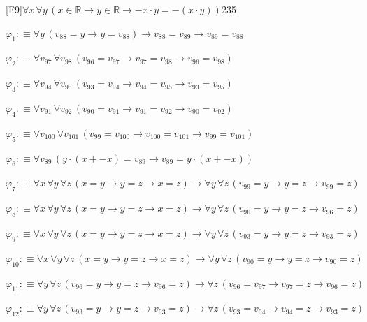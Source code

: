 \begin{fullproof}{[F9]}{$\forall x\,\forall y\,(x \in \mathbb{R} \to y \in \mathbb{R} \to -x \cdot y = -(x \cdot y))$}{235}
\begin{ptree}
\noLine
{}
\noLine
{}
\end{ptree}
\begin{abbrevlist}
\item $\varphi_{1} :\equiv \forall y\,(v_{88} = y \to y = v_{88}) \to v_{88} = v_{89} \to v_{89} = v_{88}$
\item $\varphi_{2} :\equiv \forall v_{97}\,\forall v_{98}\,(v_{96} = v_{97} \to v_{97} = v_{98} \to v_{96} = v_{98})$
\item $\varphi_{3} :\equiv \forall v_{94}\,\forall v_{95}\,(v_{93} = v_{94} \to v_{94} = v_{95} \to v_{93} = v_{95})$
\item $\varphi_{4} :\equiv \forall v_{91}\,\forall v_{92}\,(v_{90} = v_{91} \to v_{91} = v_{92} \to v_{90} = v_{92})$
\item $\varphi_{5} :\equiv \forall v_{100}\,\forall v_{101}\,(v_{99} = v_{100} \to v_{100} = v_{101} \to v_{99} = v_{101})$
\item $\varphi_{6} :\equiv \forall v_{89}\,(y \cdot (x + -x) = v_{89} \to v_{89} = y \cdot (x + -x))$
\item $\varphi_{7} :\equiv \forall x\,\forall y\,\forall z\,(x = y \to y = z \to x = z) \to \forall y\,\forall z\,(v_{99} = y \to y = z \to v_{99} = z)$
\item $\varphi_{8} :\equiv \forall x\,\forall y\,\forall z\,(x = y \to y = z \to x = z) \to \forall y\,\forall z\,(v_{96} = y \to y = z \to v_{96} = z)$
\item $\varphi_{9} :\equiv \forall x\,\forall y\,\forall z\,(x = y \to y = z \to x = z) \to \forall y\,\forall z\,(v_{93} = y \to y = z \to v_{93} = z)$
\item $\varphi_{10} :\equiv \forall x\,\forall y\,\forall z\,(x = y \to y = z \to x = z) \to \forall y\,\forall z\,(v_{90} = y \to y = z \to v_{90} = z)$
\item $\varphi_{11} :\equiv \forall y\,\forall z\,(v_{96} = y \to y = z \to v_{96} = z) \to \forall z\,(v_{96} = v_{97} \to v_{97} = z \to v_{96} = z)$
\item $\varphi_{12} :\equiv \forall y\,\forall z\,(v_{93} = y \to y = z \to v_{93} = z) \to \forall z\,(v_{93} = v_{94} \to v_{94} = z \to v_{93} = z)$

\end{abbrevlist}
\end{fullproof}
